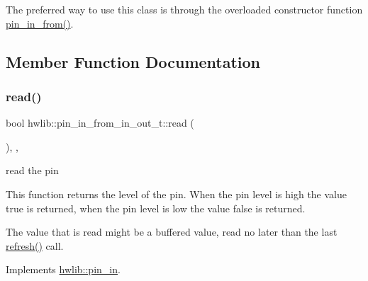 The preferred way to use this class is through the overloaded constructor function \hyperlink{namespacehwlib_a2f8ff4c157c60783c37db6bb1e11e3a4}{pin\+\_\+in\+\_\+from()}. 

\subsection{Member Function Documentation}
\mbox{\label{classhwlib_1_1pin__in__from__in__out__t_ae2f49f0010b6a6177fad9099e3d7cbd2}} 
\subsubsection{\texorpdfstring{read()}{read()}}
{\footnotesize\ttfamily bool hwlib\+::pin\+\_\+in\+\_\+from\+\_\+in\+\_\+out\+\_\+t\+::read (\begin{DoxyParamCaption}{ }\end{DoxyParamCaption})\hspace{0.3cm}{\ttfamily [inline]}, {\ttfamily [override]}, {\ttfamily [virtual]}}





read the pin

This function returns the level of the pin. When the pin level is high the value true is returned, when the pin level is low the value false is returned.

The value that is read might be a buffered value, read no later than the last \hyperlink{classhwlib_1_1pin__in__from__in__out__t_a51580b6d77cfe54dee904c9f567cbc33}{refresh()} call. 

Implements \hyperlink{classhwlib_1_1pin__in_ad071bd2e17bb4af51390f6cbb728a194}{hwlib\+::pin\+\_\+in}.

\mbox{\label{classhwlib_1_1pin__in__from__in__out__t_a51580b6d77cfe54dee904c9f567cbc33}} 
